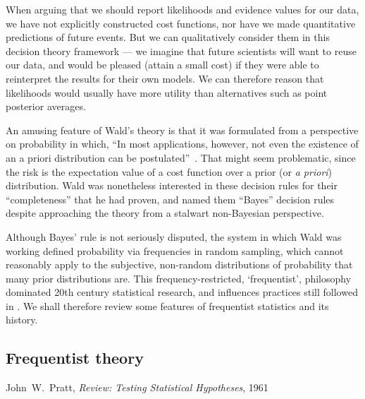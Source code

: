 When arguing that we should report likelihoods and evidence values for our
data, we have not explicitly constructed cost functions, nor have we made
quantitative predictions of future events.
But we can qualitatively consider them in this decision theory framework ---
we imagine that future scientists will want to reuse our data, and would be
pleased (attain a small cost) if they were able to reinterpret the results for
their own models.
We can therefore reason that likelihoods would usually have more utility than
alternatives such as point posterior averages.

An amusing feature of Wald's theory is that it was formulated from a
perspective on probability in which,
``In most applications, however, not even the existence of an a priori
distribution can be postulated''~\cite{wald1950bayes}.
That might seem problematic, since the risk is the expectation value of a cost
function over a prior (or \emph{a priori}) distribution.
Wald was nonetheless interested in these decision rules for their
``completeness'' that he had proven, and named them ``Bayes'' decision rules
despite approaching the theory from a stalwart non-Bayesian perspective.

Although Bayes' rule is not seriously disputed, the system in which Wald was
working defined probability via frequencies in random sampling, which cannot
reasonably apply to the subjective, non-random distributions of probability
that many prior distributions are.
This frequency-restricted, `frequentist', philosophy dominated 20th century
statistical research, and influences practices still followed in \atlas.
We shall therefore review some features of frequentist statistics and its
history.

\begin{singlespacing}
\section{Frequentist theory}
\label{sec:searches_frequentist}
\begin{epigraphs}
%
{John~W.~Pratt,
\textit{Review: Testing Statistical Hypotheses},
1961~\cite{pratt1961testing}}
\end{epigraphs}
\end{singlespacing}


